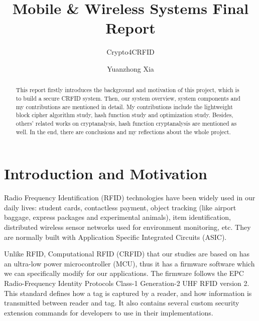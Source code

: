 \documentclass[sigconf, review=false]{acmart}
\let\OldTexttrademark\texttrademark
\renewcommand{\texttrademark}{\OldTexttrademark\xspace}%
\begin{document}
\title{Mobile \& Wireless Systems Final Report}
\subtitle{Crypto4CRFID}

\author{Yuanzhong Xia}

\begin{abstract}
    This report firstly introduces the background and motivation of this project, which is to build a secure CRFID system.
    Then, our system overview, system components and my contributions are mentioned in detail.
    My contributions include the lightweight block cipher algorithm study, hash function study and optimization study.
    Besides, others' related works on cryptanalysis, hash function cryptanalysis are mentioned as well.
    In the end, there are conclusions and my reflections about the whole project.
\end{abstract}
\maketitle



\section{Introduction and Motivation}
Radio Frequency Identification (RFID) technologies have been widely used in our daily lives:
student cards, contactless payment, object tracking (like airport baggage, express packages and experimental animals),
item identification, distributed wireless sensor networks used for environment monitoring, etc. \cite{wikipedia2017rfid}
They are normally built with Application Specific Integrated Circuits (ASIC).

Unlike RFID, Computational RFID (CRFID) that our studies are based on has an ultra-low power microcontroller (MCU),
thus it has a firmware software which we can specifically modify for our applications.
The firmware follows the EPC\texttrademark Radio-Frequency Identity Protocols Class-1 Generation-2 UHF RFID version 2\cite{epcglobal2013}.
This standard defines how a tag is captured by a reader, and how information is transmitted between reader and tag.
It also contains several custom security extension commands for developers to use in their implementations.
\end{document}
